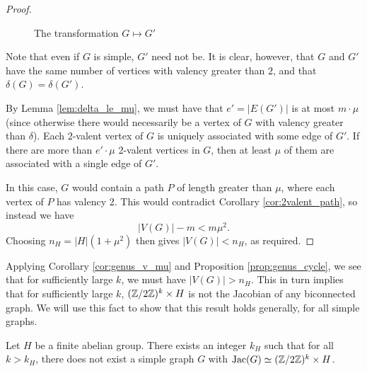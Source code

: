 \documentclass{amsart}
\begin{document}
\begin{proof}
\begin{figure}[H]
\begin{center}
\begin{tikzpicture}
      \end{tikzpicture}
      \caption{The transformation $G \mapsto G'$}
    \end{center}
  \end{figure}

  Note that even if $G$ is simple, $G'$ need not be. It is clear,
  however, that $G$ and $G'$ have the same number of vertices with
  valency greater than $2$, and that $\delta(G) = \delta(G')$.

  By Lemma \ref{lem:delta_le_mu}, we must have that $e' = |E(G')|$ is
  at most $m \cdot \mu$ (since otherwise there would necessarily be a
  vertex of $G$ with valency greater than $\delta$). Each 2-valent
  vertex of $G$ is uniquely associated with some edge of $G'$. If
  there are more than $e' \cdot \mu$ 2-valent vertices in $G$, then at
  least $\mu$ of them are associated with a single edge of $G'$.

  In this case, $G$ would contain a path $P$ of length greater than
  $\mu$, where each vertex of $P$ has valency $2$. This would
  contradict Corollary \ref{cor:2valent_path}, so instead we have
  \[
  |V(G)| - m < m\mu^2.
  \] 
  Choosing $n_H = |H|(1 + \mu^2)$ then gives $|V(G)| < n_H$, as
  required.
\end{proof}

Applying Corollary \ref{cor:genus_v_mu} and Proposition
\ref{prop:genus_cycle}, we see that for sufficiently large $k$, we
must have $|V(G)| > n_H$. This in turn implies that for sufficiently
large $k$, $(\Z/2\Z)^k \times H$ is not the Jacobian of any
biconnected graph. We will use this fact to show that this result
holds generally, for all simple graphs.

\begin{thm}
  \label{thm:2group_product}
  Let $H$ be a finite abelian group. There exists an integer $k_H$
  such that for all $k > k_H$, there does not exist a simple graph $G$
  with $\Jac(G) \simeq (\Z/2\Z)^k \times H$.
\end{thm}
  
\end{document}
